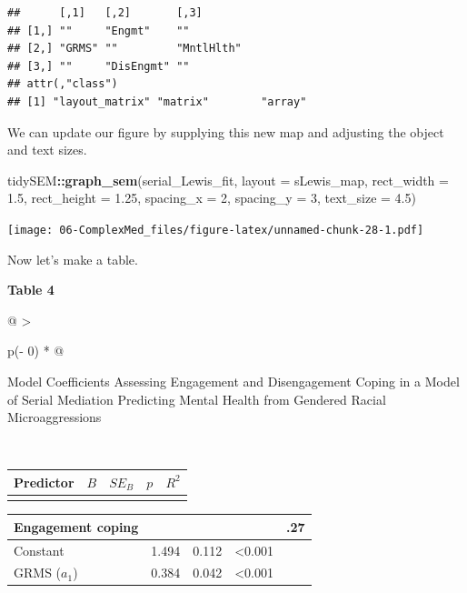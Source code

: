 \documentclass[
  11pt,
]{book}
\newenvironment{Shaded}{\begin{snugshade}}{\end{snugshade}}
\newcommand{\AttributeTok}[1]{\textcolor[rgb]{0.27,0.27,0.27}{#1}}
\newcommand{\DecValTok}[1]{\textcolor[rgb]{0.06,0.06,0.06}{#1}}
\newcommand{\FloatTok}[1]{\textcolor[rgb]{0.06,0.06,0.06}{#1}}
\newcommand{\FunctionTok}[1]{\textcolor[rgb]{0.27,0.27,0.27}{\textbf{#1}}}
\newcommand{\NormalTok}[1]{#1}
\newcommand{\SpecialCharTok}[1]{\textcolor[rgb]{0.43,0.43,0.43}{\textbf{#1}}}
\begin{document}
\begin{verbatim}
##      [,1]   [,2]       [,3]      
## [1,] ""     "Engmt"    ""        
## [2,] "GRMS" ""         "MntlHlth"
## [3,] ""     "DisEngmt" ""        
## attr(,"class")
## [1] "layout_matrix" "matrix"        "array"
\end{verbatim}

We can update our figure by supplying this new map and adjusting the object and text sizes.

\begin{Shaded}
\begin{Highlighting}[]
\NormalTok{tidySEM}\SpecialCharTok{::}\FunctionTok{graph\_sem}\NormalTok{(serial\_Lewis\_fit, }\AttributeTok{layout =}\NormalTok{ sLewis\_map, }\AttributeTok{rect\_width =} \FloatTok{1.5}\NormalTok{,}
    \AttributeTok{rect\_height =} \FloatTok{1.25}\NormalTok{, }\AttributeTok{spacing\_x =} \DecValTok{2}\NormalTok{, }\AttributeTok{spacing\_y =} \DecValTok{3}\NormalTok{, }\AttributeTok{text\_size =} \FloatTok{4.5}\NormalTok{)}
\end{Highlighting}
\end{Shaded}

\texttt{[image: 06-ComplexMed\_files/figure-latex/unnamed-chunk-28-1.pdf]}

Now let's make a table.

\textbf{Table 4 }

\begin{longtable}[]{@{}
  >{\raggedright\arraybackslash}p{(\columnwidth - 0\tabcolsep) * }@{}}
\toprule\noalign{}
\begin{minipage}[b]{\linewidth}\raggedright
Model Coefficients Assessing Engagement and Disengagement Coping in a Model of Serial Mediation Predicting Mental Health from Gendered Racial Microaggressions
\end{minipage} \\
\midrule\noalign{}
\endhead
\bottomrule\noalign{}
\endlastfoot
\end{longtable}

\begin{longtable}[]{@{}lcccr@{}}
\toprule\noalign{}
Predictor & \(B\) & \(SE_{B}\) & \(p\) & \(R^2\) \\
\midrule\noalign{}
\endhead
\bottomrule\noalign{}
\endlastfoot
\end{longtable}

\begin{longtable}[]{@{}lrrrr@{}}
\toprule\noalign{}
Engagement coping & & & & .27 \\
\midrule\noalign{}
\endhead
\bottomrule\noalign{}
\endlastfoot
Constant & 1.494 & 0.112 & \textless0.001 & \\
GRMS (\(a_1\)) & 0.384 & 0.042 & \textless0.001 & \\
\end{longtable}
\end{document}
